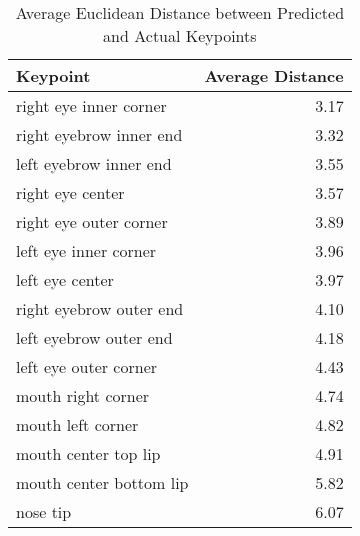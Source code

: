 \begin{table}[ht]
\centering
\caption{Average Euclidean Distance between Predicted and Actual Keypoints} 
\label{tab:radius}
\begin{tabular}{lr}
  \hline
Keypoint & Average Distance \\ 
  \hline
right eye inner corner & 3.17 \\ 
  right eyebrow inner end & 3.32 \\ 
  left eyebrow inner end & 3.55 \\ 
  right eye center & 3.57 \\ 
  right eye outer corner & 3.89 \\ 
  left eye inner corner & 3.96 \\ 
  left eye center & 3.97 \\ 
  right eyebrow outer end & 4.10 \\ 
  left eyebrow outer end & 4.18 \\ 
  left eye outer corner & 4.43 \\ 
  mouth right corner & 4.74 \\ 
  mouth left corner & 4.82 \\ 
  mouth center top lip & 4.91 \\ 
  mouth center bottom lip & 5.82 \\ 
  nose tip & 6.07 \\ 
   \hline
\end{tabular}
\end{table}
